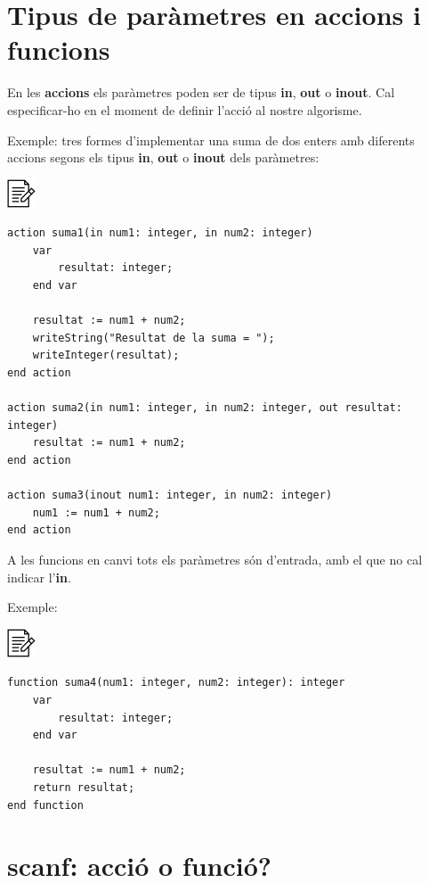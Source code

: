 \documentclass[]{book}
\begin{document}
\hypertarget{tipus-de-parametres-en-accions-i-funcions}{%
\section{Tipus de paràmetres en accions i funcions}\label{tipus-de-parametres-en-accions-i-funcions}}

En les \textbf{accions} els paràmetres poden ser de tipus \textbf{in}, \textbf{out} o \textbf{inout}. Cal especificar-ho en el moment de definir l'acció al nostre algorisme.

Exemple: tres formes d'implementar una suma de dos enters amb diferents accions segons els tipus \textbf{in}, \textbf{out} o \textbf{inout} dels paràmetres:

\includegraphics{./img/alg.png}

\begin{verbatim}
action suma1(in num1: integer, in num2: integer)
    var
        resultat: integer;
    end var

    resultat := num1 + num2;
    writeString("Resultat de la suma = ");
    writeInteger(resultat);
end action

action suma2(in num1: integer, in num2: integer, out resultat: integer)
    resultat := num1 + num2;
end action

action suma3(inout num1: integer, in num2: integer)
    num1 := num1 + num2;
end action
\end{verbatim}

A les funcions en canvi tots els paràmetres són d'entrada, amb el que no cal indicar l'\textbf{in}.

Exemple:

\includegraphics{./img/alg.png}

\begin{verbatim}
function suma4(num1: integer, num2: integer): integer
    var
        resultat: integer;
    end var

    resultat := num1 + num2;
    return resultat;
end function
\end{verbatim}

\hypertarget{scanf-accio-o-funcio}{%
\section{scanf: acció o funció?}\label{scanf-accio-o-funcio}}
\end{document}
